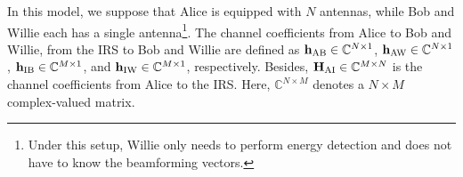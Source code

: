 \documentclass[10pt,journal,letterpaper,twocolumn,twoside]{IEEEtran} %
\begin{document}

In this model, we suppose that  Alice is equipped with $N$ antennas, while
    Bob and Willie each has a single antenna\footnote{
    Under this setup, Willie only needs to perform energy detection and does not have to know the beamforming vectors.}.
The channel coefficients from Alice to  Bob and Willie, from  the IRS to Bob and Willie are defined as ${{\bf{h}}_{\rm{AB}}} \in {\mathbb{C}^ {N \times 1}}$, ${{\bf{h}}_{\rm{AW}}} \in {\mathbb{C}^{N \times 1}}$,  ${{\bf{h}}_{\rm{IB}}} \in {\mathbb{C}^ {M \times 1}}$, and ${{\bf{h}}_{\rm{IW}}} \in {\mathbb{C}^{M \times 1}}$, respectively.
Besides, ${{\bf{H}}_{{\rm{AI}}}}\in {\mathbb{C}^ {M \times N}}$
  is the channel coefficients from Alice to the IRS. Here, ${\mathbb{C}^ {N \times M}}$
denotes a ${N \times M}$ complex-valued matrix.
\end{document}

